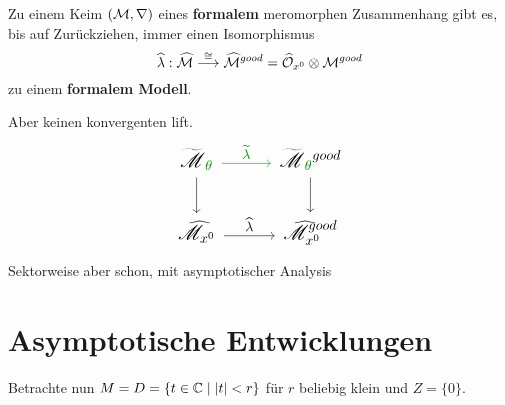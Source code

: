 \begin{paracol}{2}
  \begin{tthm}
    Zu einem Keim $(\mathcal{M},\nabla)$ eines \textbf{formalem} meromorphen
    Zusammenhang gibt es, bis auf Zurückziehen, immer einen Isomorphismus
    \[
      \widehat\lambda:\widehat{\mathcal{M}}
      \overset{\cong}\longrightarrow
      \widehat{\mathcal{M}}^{good}
      =\widehat{\mathcal{O}}_{x^0}\otimes\mathcal{M}^{good}
    \]
    zu einem \textbf{formalem Modell}.
  \end{tthm}
\switchcolumn
  \begin{rem}
    Aber keinen konvergenten lift.
    \[ \Large\begin{tikzcd}
        \textcolor{green!60!black}{\tilde{\textcolor{black}{\sM}}_{\theta}}\dar
        \rar[green!60!black]{\tilde\lambda}&
        \textcolor{green!60!black}{%
          \tilde{\textcolor{black}{\sM}}_{\theta}}^{good} \dar
        \\\hat\sM_{x^0} \rar{\hat\lambda} &
          \hat\sM_{x^0}^{good}
    \end{tikzcd} \]
    \textcolor{green!60!black}{Sektorweise aber schon, mit asymptotischer
    Analysis}
  \end{rem}
\end{paracol}
\pagebreak \section{Asymptotische Entwicklungen} %
Betrachte nun $M=D=\{t\in\mathbb{C}\mid|t|<r\}$ für $r$ beliebig klein und $Z=\{0\}$.
